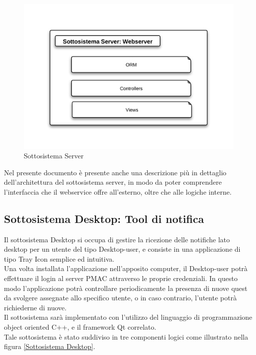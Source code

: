 {{%
\begin{figure}[H]
\centering
\includegraphics[scale=0.7]{images/cap2/Server/sottosistemaServer.png} %
\caption{Sottosistema Server}
\end{figure}

Nel presente documento è presente anche una descrizione più in dettaglio dell'architettura del sottosistema server, in modo da poter comprendere l'interfaccia che il webservice offre all'esterno, oltre che alle logiche interne.


\subsection{Sottosistema Desktop: Tool di notifica}

Il sottosistema Desktop si occupa di gestire la ricezione delle notifiche lato desktop per un utente del tipo Desktop-user, e consiste in una applicazione di tipo Tray Icon semplice ed intuitiva.\\
Una volta installata l'applicazione nell'apposito computer, il Desktop-user potrà effettuare il login al server PMAC attraverso le proprie credenziali. In questo modo l'applicazione potrà controllare periodicamente la presenza di nuove quest da svolgere assegnate allo specifico utente, o in caso contrario, l'utente potrà richiederne di nuove.\\
Il sottosistema sarà implementato con l'utilizzo del linguaggio di programmazione object oriented C++, e il framework Qt correlato.\\
Tale sottosistema è stato suddiviso in tre componenti logici come illustrato nella figura \ref{Sottosistema Desktop}.


}}
